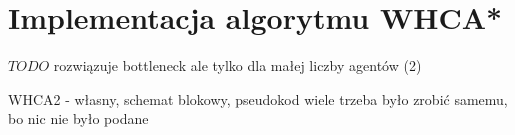 \section{Implementacja algorytmu WHCA*}
\label{ch:alg-whca}

$TODO$ rozwiązuje bottleneck ale tylko dla małej liczby agentów (2)

WHCA2 - własny, schemat blokowy, pseudokod
wiele trzeba było zrobić samemu, bo nic nie było podane